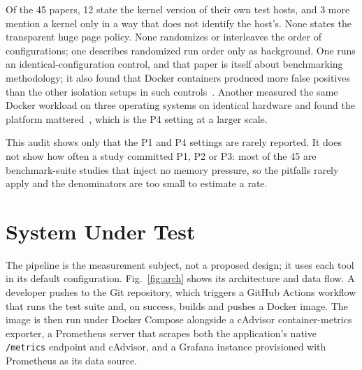 \documentclass[conference]{IEEEtran}
\begin{document}
Of the 45 papers, 12 state the kernel version of their own test hosts, and 3 more mention
a kernel only in a way that does not identify the host's. None states the transparent huge
page policy. None randomizes or interleaves the order of configurations; one describes
randomized run order only as background. One runs an identical-configuration control, and
that paper is itself about benchmarking methodology; it also found that Docker containers
produced more false positives than the other isolation setups in such controls~\cite{japke2025}.
Another measured the same Docker workload on three operating systems on identical
hardware and found the platform mattered~\cite{sobieraj2024}, which is the P4 setting at
a larger scale.

This audit shows only that the P1 and P4 settings are rarely reported. It does not show
how often a study committed P1, P2 or P3: most of the 45 are benchmark-suite studies that
inject no memory pressure, so the pitfalls rarely apply and the denominators are too small
to estimate a rate.

\section{System Under Test}

The pipeline is the measurement subject, not a proposed design; it uses each tool in
its default configuration. Fig.~\ref{fig:arch} shows its architecture and data flow. A
developer pushes to the Git repository, which triggers a GitHub Actions
workflow that runs the test suite and, on success, builds and pushes a
Docker image. The image is then run under Docker Compose alongside a
cAdvisor container-metrics exporter, a Prometheus server that scrapes both
the application's native \texttt{/metrics} endpoint and cAdvisor, and a
Grafana instance provisioned with Prometheus as its data source.
\end{document}
